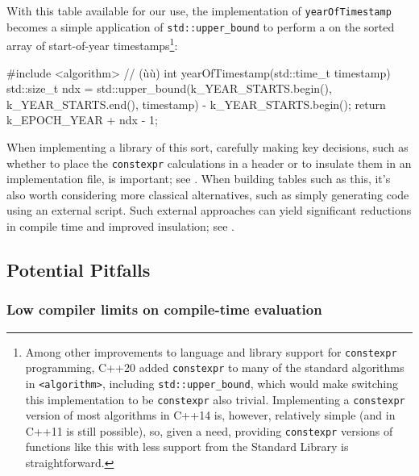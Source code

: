 \noindent With this table available for our use, the implementation of
\lstinline!yearOfTimestamp! becomes a simple application of
\lstinline!std::upper_bound! to perform a  on the
sorted array of start-of-year timestamps{\cprotect\footnote{Among other
improvements to language and library support for \lstinline!constexpr!
programming, C++20 added \lstinline!constexpr! to many of the standard
algorithms in \lstinline!<algorithm>!, including
\lstinline!std::upper_bound!, which would make switching this
implementation to be \lstinline!constexpr! also trivial. Implementing a
\lstinline!constexpr! version of most algorithms in C++14 is, however,
relatively simple (and in C++11 is still possible), so, given a need,
providing \lstinline!constexpr! versions of functions like this with less
  support from the Standard Library is straightforward.}}:

\begin{emcppshiddenlisting}[emcppsbatch=e14]
\end{emcppshiddenlisting}
\begin{emcppslisting}[emcppsbatch=e14]
#include <algorithm>  // (ù{}ù)
int yearOfTimestamp(std::time_t timestamp)
{
    std::size_t ndx = std::upper_bound(k_YEAR_STARTS.begin(),
                                       k_YEAR_STARTS.end(),
                                       timestamp)
                    - k_YEAR_STARTS.begin();
    return k_EPOCH_YEAR + ndx - 1;
}
\end{emcppslisting}

\noindent When implementing a library of this sort, carefully making key
decisions, such as whether to place the \lstinline!constexpr! calculations
in a header or to insulate them in an implementation file, is important;
see . When
building tables such as this, it's also worth considering more classical
alternatives, such as simply generating code using an external script.
Such external approaches can yield significant reductions in compile
time and improved insulation; see .

\subsection[Potential Pitfalls]{Potential Pitfalls}\label{potential-pitfalls-constexprfunc}

\subsubsection[Low compiler limits on compile-time evaluation]{Low compiler limits on compile-time evaluation}\label{low-compiler-limits-on-compile-time-evaluation}

